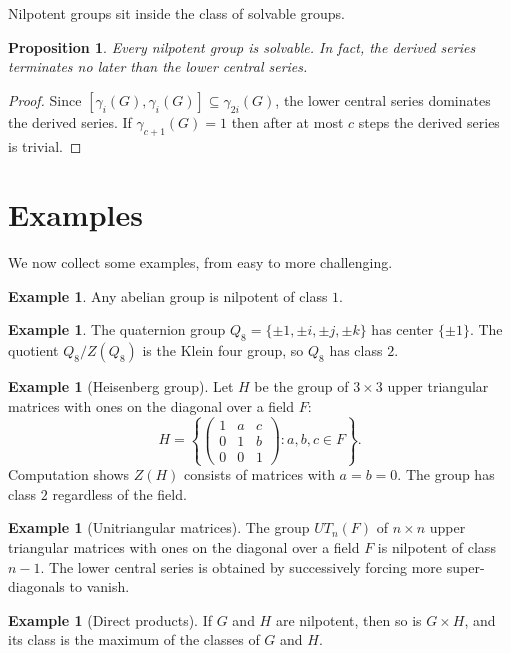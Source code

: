 \documentclass{article}
\newtheorem{proposition}[theorem]{Proposition}
\theoremstyle{definition}
\newtheorem{example}[theorem]{Example}
\begin{document}
Nilpotent groups sit inside the class of solvable groups.

\begin{proposition}
Every nilpotent group is solvable.  In fact, the derived series terminates no later than the lower central series.
\end{proposition}
\begin{proof}
Since $[\gamma_i(G),\gamma_i(G)] \subseteq \gamma_{2i}(G)$, the lower central series dominates the derived series.  If $\gamma_{c+1}(G)=1$ then after at most $c$ steps the derived series is trivial.
\end{proof}

\section{Examples}

We now collect some examples, from easy to more challenging.

\begin{example}
Any abelian group is nilpotent of class $1$.
\end{example}

\begin{example}
The quaternion group $Q_8=\{\pm1,\pm i,\pm j,\pm k\}$ has center $\{\pm 1\}$.  The quotient $Q_8/Z(Q_8)$ is the Klein four group, so $Q_8$ has class $2$.
\end{example}

\begin{example}[Heisenberg group]
Let $H$ be the group of $3\times3$ upper triangular matrices with ones on the diagonal over a field $F$:
\[
H=\left\{\begin{pmatrix}1&a&c\\0&1&b\\0&0&1\end{pmatrix} : a,b,c\in F\right\}.
\]
Computation shows $Z(H)$ consists of matrices with $a=b=0$.  The group has class $2$ regardless of the field.
\end{example}

\begin{example}[Unitriangular matrices]
The group $UT_n(F)$ of $n\times n$ upper triangular matrices with ones on the diagonal over a field $F$ is nilpotent of class $n-1$.  The lower central series is obtained by successively forcing more super-diagonals to vanish.
\end{example}

\begin{example}[Direct products]
If $G$ and $H$ are nilpotent, then so is $G\times H$, and its class is the maximum of the classes of $G$ and $H$.
\end{example}
\end{document}
